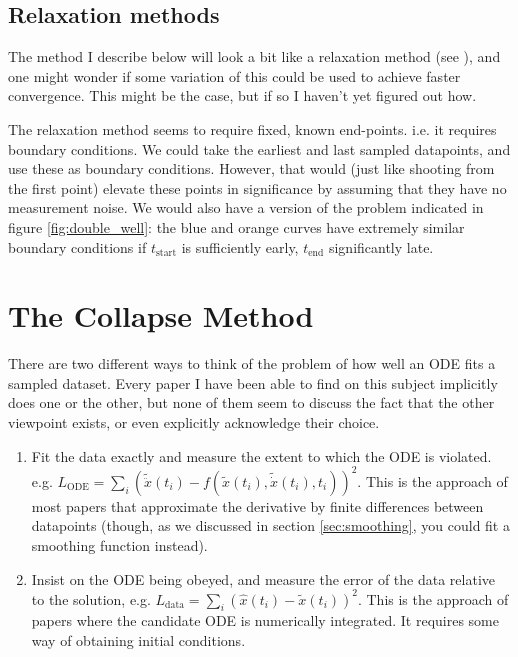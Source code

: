 \documentclass{article}
\begin{document}
\subsection{Relaxation methods}

The method I describe below will look a bit like a relaxation method (see \cite{wikipediaRelaxationMethod}), and one might wonder if some variation of this could be used to achieve faster convergence.
This might be the case, but if so I haven't yet figured out how.

The relaxation method seems to require fixed, known end-points.
i.e. it requires boundary conditions.
We could take the earliest and last sampled datapoints, and use these as boundary conditions.
However, that would (just like shooting from the first point) elevate these points in significance by assuming that they have no measurement noise.
We would also have a version of the problem indicated in figure \ref{fig:double_well}: the blue and orange curves have extremely similar boundary conditions if $t_{\mathrm{start}}$ is sufficiently early, $t_{\mathrm{end}}$ significantly late.

\section{The Collapse Method}
\label{sec:method}

There are two different ways to think of the problem of how well an ODE fits a sampled dataset. Every paper I have been able to find on this subject implicitly does one or the other, but none of them seem to discuss the fact that the other viewpoint exists, or even explicitly acknowledge their choice.
\begin{enumerate}
\item Fit the data exactly and measure the extent to which the ODE is violated. e.g. $L_{\mathrm{ODE}} = \sum_i \left( \tilde{\ddot{x}}(t_i) - f(\tilde{x}(t_i), \tilde{\dot{x}}(t_i), t_i)\right)^2$.
This is the approach of most papers that approximate the derivative by finite differences between datapoints (though, as we discussed in section \ref{sec:smoothing}, you could fit a smoothing function instead).
\item Insist on the ODE being obeyed, and measure the error of the data relative to the solution, e.g. $L_{\mathrm{data}} = \sum_i \left( \hat{x}(t_i) - \tilde{x}(t_i) \right)^2$.
This is the approach of papers where the candidate ODE is numerically integrated. It requires some way of obtaining initial conditions. 
\end{enumerate}
\end{document}
